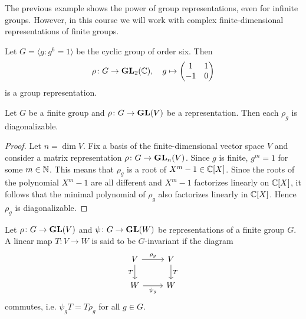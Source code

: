 The previous example shows the power of group representations, even for infinite groups.   
However, in this course we will work with complex finite-dimensional 
representations of finite
groups.  

\begin{example}
	Let $G=\langle g:g^6=1\rangle$ be the cyclic group of order six. Then
	\[
	\rho\colon G\to\mathbf{GL}_2(\mathbb{C}),
	\quad 
	g\mapsto\begin{pmatrix}1&1\\-1&0\end{pmatrix}
	\] 
	is a group representation. 
\end{example}

\begin{example}
	
\end{example}

\begin{example}
	
\end{example}


\begin{proposition}
    Let $G$ be a finite group and $\rho\colon G\to\mathbf{GL}(V)$ be a representation. Then
    each $\rho_g$ is diagonalizable.
\end{proposition}

\begin{proof}
    Let $n=\dim V$. Fix a basis of the finite-dimensional vector space $V$ and consider
    a matrix representation $\rho\colon G\to\mathbf{GL}_n(V)$.
    Since $g$ is finite, $g^m=1$ for some $m\in\mathbb{N}$. This means that $\rho_g$ is a root of $X^m-1\in\mathbb{C}[X]$. Since
    the roots of the polynomial $X^m-1$ are all different and $X^m-1$ factorizes linearly on $\mathbb{C}[X]$, it follows
    that the minimal polynomial of $\rho_g$ also factorizes linearly in $\mathbb{C}[X]$. Hence $\rho_g$ is diagonalizable.
\end{proof}

\begin{definition}
    Let $\rho\colon G\to\mathbf{GL}(V)$ and $\psi\colon G\to\mathbf{GL}(W)$ be
    representations of a finite group $G$. A linear map $T\colon V\to W$ is said to be $G$-invariant
    if the diagram
    \[\begin{tikzcd}
	V & V \\
	W & W
	\arrow["{\rho_g}", from=1-1, to=1-2]
	\arrow["T"', from=1-1, to=2-1]
	\arrow["{\psi_g}"', from=2-1, to=2-2]
	\arrow["T", from=1-2, to=2-2]
\end{tikzcd}\]
    commutes, i.e. $\psi_gT=T\rho_g$ for all $g\in G$.
\end{definition}

